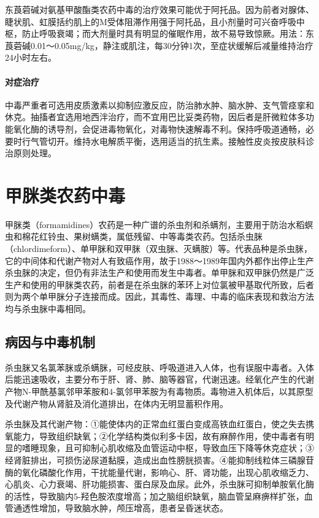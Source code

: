 东莨菪碱对氨基甲酸酯类农药中毒的治疗效果可能优于阿托品。因为前者对腺体、睫状肌、虹膜括约肌上的M受体阻滞作用强于阿托品，且小剂量时可兴奋呼吸中枢，防止呼吸衰竭；而大剂量时具有明显的催眠作用，故不易导致惊厥。用法：东莨菪碱0.01～0.05mg/kg，静注或肌注，每30分钟1次，至症状缓解后减量维持治疗24小时左右。

\paragraph{对症治疗}

中毒严重者可选用皮质激素以抑制应激反应，防治肺水肿、脑水肿、支气管痉挛和休克。抽搐者宜选用地西泮治疗，而不宜用巴比妥类药物，因后者是肝微粒体多功能氧化酶的诱导剂，会促进毒物氧化，对毒物快速解毒不利。保持呼吸道通畅，必要时行气管切开。维持水电解质平衡，选用适当的抗生素。接触性皮炎按皮肤科诊治原则处理。

\protect\hypertarget{text00142.html}{}{}

\section{甲脒类农药中毒}

甲脒类（formamidines）农药是一种广谱的杀虫剂和杀螨剂，主要用于防治水稻螟虫和棉花红铃虫、果树螨类，属低残留、中等毒类农药。包括杀虫脒（chlordimeform）、单甲脒和双甲脒（双虫脒、灭螨胺）等。代表品种是杀虫脒，它的中间体和代谢产物对人有致癌作用，故于1988～1989年国内外都作出停止生产杀虫脒的决定，但仍有非法生产和使用而发生中毒者。单甲脒和双甲脒仍然是广泛生产和使用的甲脒类农药，前者是在杀虫脒的苯环上对位氯被甲基取代所致，后者则为两个单甲脒分子连接而成。因此，其毒性、毒理、中毒的临床表现和救治方法均与杀虫脒中毒相同。

\subsection{病因与中毒机制}

杀虫脒又名氯苯脒或杀螨脒，可经皮肤、呼吸道进入人体，也有误服中毒者。入体后能迅速吸收，主要分布于肝、肾、肺、脑等器官，代谢迅速。经氧化产生的代谢产物N-甲酰基氯邻甲苯胺和4-氯邻甲苯胺为有毒物质。毒物进入机体后，以其原型及代谢产物从肾脏及消化道排出，在体内无明显蓄积作用。

杀虫脒及其代谢产物：①能使体内的正常血红蛋白变成高铁血红蛋白，使之失去携氧能力，导致组织缺氧；②化学结构类似利多卡因，故有麻醉作用，使中毒者有明显的嗜睡现象，且可抑制心肌收缩及血管运动中枢，导致血压下降等休克症状；③经肾脏排出，可损伤泌尿道黏膜，造成出血性膀胱损害。④能抑制线粒体三磷腺苷酶的氧化磷酸化作用，干扰能量代谢，影响心、肝、肾功能，出现心肌收缩乏力、心肌炎、心力衰竭、肝功能损害、蛋白尿及血尿。此外，杀虫脒可抑制单胺氧化酶的活性，导致脑内5-羟色胺浓度增高；加之脑组织缺氧，脑血管呈麻痹样扩张，血管通透性增加，导致脑水肿，颅压增高，患者呈昏迷状态。

